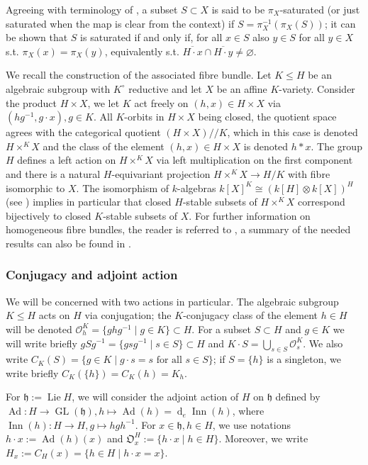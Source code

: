 \documentclass[12pt]{amsart}
\theoremstyle{definition}
\theoremstyle{remark}
\newcommand{\h}{\mathfrak{h}}
\newcommand{\orb}{\mathfrak{O}}
\renewcommand{\O}{\mathcal{O}}
\newcommand{\diff}{\operatorname{d}}
\newcommand{\Ad}{\operatorname{Ad}}
\newcommand{\Lie}{\operatorname{Lie}}
\newcommand{\GL}{\operatorname{GL}}
\newcommand{\Inn}{\operatorname{Inn}}
\begin{document}
Agreeing with terminology of \cite{Luna},  a subset $S \subset X$ is said to be $\pi_{X}$-saturated (or just saturated when the map is clear from the context) if $S = \pi_{X}^{-1}(\pi_{X}(S))$; it can be shown that $S$ is saturated if and only if, for all $x \in S$ also $y \in S$ for all $y \in X$ s.t. $\pi_X(x) = \pi_X(y)$, equivalently s.t. $\overline{H \cdot x} \cap \overline{H \cdot y} \neq \varnothing$.

We recall the construction of the associated fibre bundle.
Let $K \leq H$ be an algebraic subgroup with $K^\circ$ reductive and let $X$ be an affine $K$-variety.
Consider the product $H \times X$, we let $K$ act freely on $(h,x) \in H \times X$ via $(hg^{-1}, g\cdot x), g \in K$.
All $K$-orbits in $H \times X$ being closed, the quotient space agrees with the categorical quotient
 $(H \times X) /\!/ K$, which in this case is  denoted $H \times^K X$ and the class of the element $(h,x) 
 \in H \times X$ is denoted $h * x$.
The group $H$ defines a left action on $H \times^K X$ via left multiplication on the first component and there is a natural  $H$-equivariant projection $H \times^K X \to H/K$ with fibre isomorphic to $X$.
The isomorphism of $k$-algebras $k[X]^K \cong (k[H] \otimes k[X])^H$ (see \cite[\S 5.3.3]{BR}) implies in particular  that closed $H$-stable subsets of $H \times^K X$ correspond bijectively to closed $K$-stable subsets of $X$.
For further information on homogeneous fibre bundles, the reader is referred to \cite{Se}, a summary of the needed results can also be found in \cite[\S 5]{BR}.

\subsubsection{Conjugacy and adjoint action}
We will be concerned with two actions in particular.
The algebraic subgroup $K \leq H$ acts on $H$ via conjugation; the $K$-conjugacy class of the element $h \in H$ will be denoted 
$\O^K_h = \{ ghg^{-1} \mid g \in K\} \subset H$.
For a subset $S \subset H$ and $g \in K$ we will write briefly $g S g^{-1} = \{gsg^{-1} \mid s \in S \} \subset H$ and $K \cdot S = \bigcup_{s \in S} \O^K_s$. 
We also write $C_K(S) = \{g \in K \mid g \cdot s = s \mbox{ for all } s \in S \}$; if $S = \{h\}$ is a singleton, we write briefly $C_K(\{h\}) = C_K(h) = K_h$.

For $\h := \Lie H$, we will consider the adjoint action of $H$ on $\h$ defined by $\Ad \colon H \to \GL(\h), h \mapsto \Ad(h) = \diff_e \Inn(h)$, where $\Inn(h) \colon H \to H, g \mapsto hgh^{-1}$.
For $x \in \h, h \in H$, we use notations $h \cdot x := \Ad(h)(x)$ and $\orb^H_x := \{h \cdot x \mid h \in H \}$.
Moreover, we write $H_x := C_H(x) = \{h \in H \mid h \cdot x = x\}$.
\end{document}
